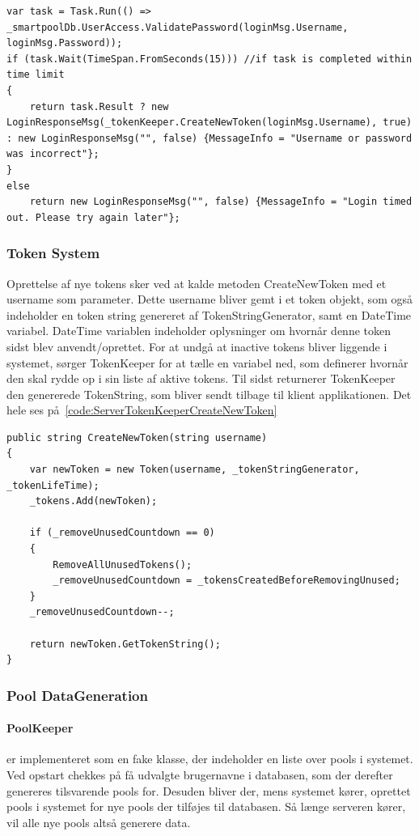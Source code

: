 \begin{lstlisting}[caption=Server.ResponseManager.HandleLoginRequest, label=code:Server.ResponseManager.HandleLoginRequest]
var task = Task.Run(() => _smartpoolDb.UserAccess.ValidatePassword(loginMsg.Username, loginMsg.Password));
if (task.Wait(TimeSpan.FromSeconds(15))) //if task is completed within time limit
{
	return task.Result ? new LoginResponseMsg(_tokenKeeper.CreateNewToken(loginMsg.Username), true) : new LoginResponseMsg("", false) {MessageInfo = "Username or password was incorrect"};
}
else
	return new LoginResponseMsg("", false) {MessageInfo = "Login timed out. Please try again later"};
\end{lstlisting}

\subsubsection{Token System}
Oprettelse af nye tokens sker ved at kalde metoden CreateNewToken med et username som parameter. Dette username bliver gemt i et token objekt, som også indeholder en token string genereret af TokenStringGenerator, samt en DateTime variabel. DateTime variablen indeholder oplysninger om hvornår denne token sidst blev anvendt/oprettet.
For at undgå at inactive tokens bliver liggende i systemet, sørger TokenKeeper for at tælle en variabel ned, som definerer hvornår den skal rydde op i sin liste af aktive tokens. Til sidst returnerer TokenKeeper den genererede TokenString, som bliver sendt tilbage til klient applikationen. Det hele ses på~\ref{code:ServerTokenKeeperCreateNewToken}
\begin{lstlisting}[caption=Server.TokenKeeper.CreateNewToken, label=code:ServerTokenKeeperCreateNewToken]
public string CreateNewToken(string username)
{
	var newToken = new Token(username, _tokenStringGenerator, _tokenLifeTime);
	_tokens.Add(newToken);
	
	if (_removeUnusedCountdown == 0)
	{
		RemoveAllUnusedTokens();
		_removeUnusedCountdown = _tokensCreatedBeforeRemovingUnused;
	}
	_removeUnusedCountdown--;
	
	return newToken.GetTokenString();
}
\end{lstlisting}

\subsubsection{Pool DataGeneration}
\paragraph{PoolKeeper} er implementeret som en fake klasse, der indeholder en liste over pools i systemet. Ved opstart chekkes på få udvalgte brugernavne i databasen, som der derefter genereres tilsvarende pools for. Desuden bliver der, mens systemet kører, oprettet pools i systemet for nye pools der tilføjes til databasen. Så længe serveren kører, vil alle nye pools altså generere data.

